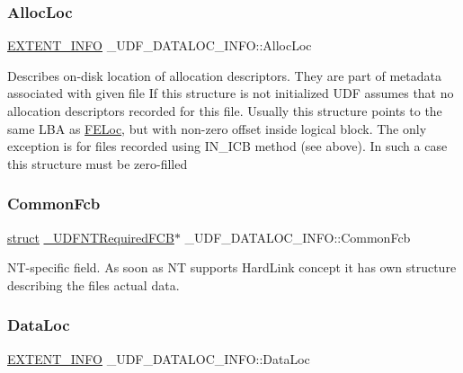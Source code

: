 \subsubsection{\texorpdfstring{Alloc\+Loc}{AllocLoc}}
{\footnotesize\ttfamily \hyperlink{struct___e_x_t_e_n_t___i_n_f_o}{E\+X\+T\+E\+N\+T\+\_\+\+I\+N\+FO} \+\_\+\+U\+D\+F\+\_\+\+D\+A\+T\+A\+L\+O\+C\+\_\+\+I\+N\+F\+O\+::\+Alloc\+Loc}

Describes on-\/disk location of allocation descriptors. They are part of metadata associated with given file If this structure is not initialized U\+DF assumes that no allocation descriptors recorded for this file. Usually this structure points to the same L\+BA as \hyperlink{struct___u_d_f___d_a_t_a_l_o_c___i_n_f_o_a412523da551f2c58ace14d1ca23b5ec8}{F\+E\+Loc}, but with non-\/zero offset inside logical block. The only exception is for files recorded using I\+N\+\_\+\+I\+CB method (see above). In such a case this structure must be zero-\/filled \mbox{\label{struct___u_d_f___d_a_t_a_l_o_c___i_n_f_o_aa16e04c294edf8f5cdf5e214c390c246}} 
\subsubsection{\texorpdfstring{Common\+Fcb}{CommonFcb}}
{\footnotesize\ttfamily \hyperlink{interfacestruct}{struct} \hyperlink{struct___u_d_f_n_t_required_f_c_b}{\+\_\+\+U\+D\+F\+N\+T\+Required\+F\+CB}$\ast$ \+\_\+\+U\+D\+F\+\_\+\+D\+A\+T\+A\+L\+O\+C\+\_\+\+I\+N\+F\+O\+::\+Common\+Fcb}

N\+T-\/specific field. As soon as NT supports Hard\+Link concept it has own structure describing the file\textquotesingle{}s actual data. \mbox{\label{struct___u_d_f___d_a_t_a_l_o_c___i_n_f_o_a9515c0bbac1936572a7347ae50e7dd55}} 
\subsubsection{\texorpdfstring{Data\+Loc}{DataLoc}}
{\footnotesize\ttfamily \hyperlink{struct___e_x_t_e_n_t___i_n_f_o}{E\+X\+T\+E\+N\+T\+\_\+\+I\+N\+FO} \+\_\+\+U\+D\+F\+\_\+\+D\+A\+T\+A\+L\+O\+C\+\_\+\+I\+N\+F\+O\+::\+Data\+Loc}

